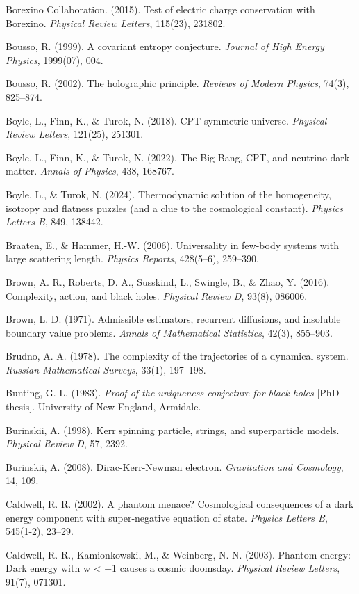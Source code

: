 \documentclass[
]{article}
\begin{document}
Borexino Collaboration. (2015). Test of electric charge conservation
with Borexino. \emph{Physical Review Letters}, 115(23), 231802.

Bousso, R. (1999). A covariant entropy conjecture. \emph{Journal of High
Energy Physics}, 1999(07), 004.

Bousso, R. (2002). The holographic principle. \emph{Reviews of Modern
Physics}, 74(3), 825--874.

Boyle, L., Finn, K., \& Turok, N. (2018). CPT-symmetric universe.
\emph{Physical Review Letters}, 121(25), 251301.

Boyle, L., Finn, K., \& Turok, N. (2022). The Big Bang, CPT, and
neutrino dark matter. \emph{Annals of Physics}, 438, 168767.

Boyle, L., \& Turok, N. (2024). Thermodynamic solution of the
homogeneity, isotropy and flatness puzzles (and a clue to the
cosmological constant). \emph{Physics Letters B}, 849, 138442.

Braaten, E., \& Hammer, H.-W. (2006). Universality in few-body systems
with large scattering length. \emph{Physics Reports}, 428(5--6),
259--390.

Brown, A. R., Roberts, D. A., Susskind, L., Swingle, B., \& Zhao, Y.
(2016). Complexity, action, and black holes. \emph{Physical Review D},
93(8), 086006.

Brown, L. D. (1971). Admissible estimators, recurrent diffusions, and
insoluble boundary value problems. \emph{Annals of Mathematical
Statistics}, 42(3), 855--903.

Brudno, A. A. (1978). The complexity of the trajectories of a dynamical
system. \emph{Russian Mathematical Surveys}, 33(1), 197--198.

Bunting, G. L. (1983). \emph{Proof of the uniqueness conjecture for
black holes} {[}PhD thesis{]}. University of New England, Armidale.

Burinskii, A. (1998). Kerr spinning particle, strings, and superparticle
models. \emph{Physical Review D}, 57, 2392.

Burinskii, A. (2008). Dirac-Kerr-Newman electron. \emph{Gravitation and
Cosmology}, 14, 109.

Caldwell, R. R. (2002). A phantom menace? Cosmological consequences of a
dark energy component with super-negative equation of state.
\emph{Physics Letters B}, 545(1-2), 23--29.

Caldwell, R. R., Kamionkowski, M., \& Weinberg, N. N. (2003). Phantom
energy: Dark energy with w \textless{} −1 causes a cosmic doomsday.
\emph{Physical Review Letters}, 91(7), 071301.
\end{document}
